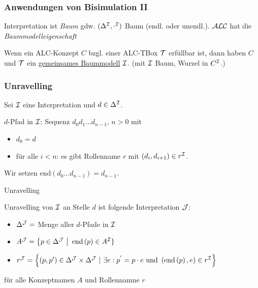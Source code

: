 \subsubsection{Anwendungen von Bisimulation II}\label{theorem-3.6}

Interpretation ist \emph{Baum} gdw. $(\Delta^{\mathcal{I}}, \cdot^{\mathcal{I}})$ Baum (endl. oder unendl.). $\mathcal{A}\mathcal{L}\mathcal{C}$ hat die \emph{Baummodelleigenschaft}

\begin{theorem}
Wenn ein ALC-Konzept $C$ bzgl. einer ALC-TBox $\mathcal{T}$ erfüllbar ist,
dann haben $C$ und $\mathcal{T}$ ein \underline{gemeinsames Baummodell} $\mathcal{I}$. (mit $\mathcal{I}$ Baum, Wurzel in $C^{\mathcal{I}}$.)
\end{theorem}

\subsubsection{Unravelling}\label{unravelling}

Sei $\mathcal{I}$ eine Interpretation und $d \in \Delta^{\mathcal{I}}$. 

$d$-Pfad in $\mathcal{I}$: Sequenz $d_{0}d_{1}\ldots d_{n - 1}$, $n > 0$ mit

\begin{itemize}
\item
  $d_{0} = d$
\item
  für alle $i < n$: es gibt Rollenname $r$ mit
  $\left( d_{i},d_{i + 1} \right) \in r^{\mathcal{I}}$.
\end{itemize}

Wir setzen
$\text{end}\left( d_{0}\ldots d_{n - 1} \right) = d_{n - 1}$.

\begin{definition}{Unravelling}

Unravelling von $\mathcal{I}$ an Stelle $d$ ist folgende Interpretation $\mathcal{J}$:

\begin{itemize}
\item
  $\Delta^{\mathcal{J}} =$ Menge aller $d$-Pfade in $\mathcal{I}$
\item
  $A^{\mathcal{J}} = \left\{ p \in \Delta^{\mathcal{J}}\  \right|\text{\ end}\left( p \right) \in A^{\mathcal{I}}\}$
\item
  $r^{\MJ} = \left\{ \left( p,p' \right) \in \Delta^{\MJ} \times \Delta^{\MJ}\ |\ \exists e:p^{'} = p \cdot e\ \mathrm{\text{und}}\ \left( \text{end}\left( p \right),e \right) \in r^{\MI} \right\}$
\end{itemize}

für alle Konzeptnamen $A$ und Rollennamne $r$
\end{definition}

